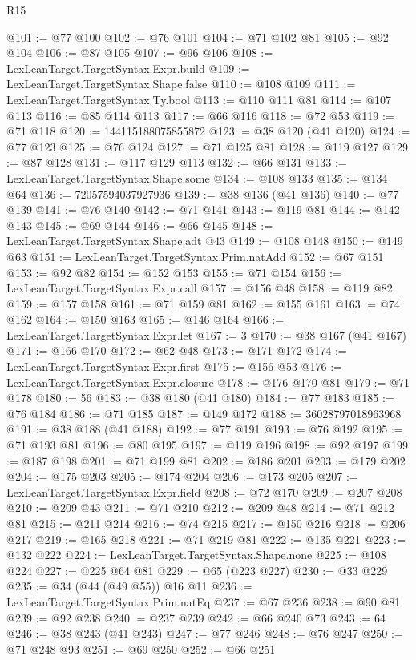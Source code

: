 \begin{lexlean}{R15}
\begin{coremodule}
@101 := @77 @100
@102 := @76 @101
@104 := @71 @102 @81
@105 := @92 @104
@106 := @87 @105
@107 := @96 @106
@108 := LexLeanTarget.TargetSyntax.Expr.build
@109 := LexLeanTarget.TargetSyntax.Shape.false
@110 := @108 @109
@111 := LexLeanTarget.TargetSyntax.Ty.bool
@113 := @110 @111 @81
@114 := @107 @113
@116 := @85 @114 @113
@117 := @66 @116
@118 := @72 @53
@119 := @71 @118
@120 := 144115188075855872
@123 := @38 @120 (@41 @120)
@124 := @77 @123
@125 := @76 @124
@127 := @71 @125 @81
@128 := @119 @127
@129 := @87 @128
@131 := @117 @129 @113
@132 := @66 @131
@133 := LexLeanTarget.TargetSyntax.Shape.some
@134 := @108 @133
@135 := @134 @64
@136 := 72057594037927936
@139 := @38 @136 (@41 @136)
@140 := @77 @139
@141 := @76 @140
@142 := @71 @141
@143 := @119 @81
@144 := @142 @143
@145 := @69 @144
@146 := @66 @145
@148 := LexLeanTarget.TargetSyntax.Shape.adt @43
@149 := @108 @148
@150 := @149 @63
@151 := LexLeanTarget.TargetSyntax.Prim.natAdd
@152 := @67 @151
@153 := @92 @82
@154 := @152 @153
@155 := @71 @154
@156 := LexLeanTarget.TargetSyntax.Expr.call
@157 := @156 @48
@158 := @119 @82
@159 := @157 @158
@161 := @71 @159 @81
@162 := @155 @161
@163 := @74 @162
@164 := @150 @163
@165 := @146 @164
@166 := LexLeanTarget.TargetSyntax.Expr.let
@167 := 3
@170 := @38 @167 (@41 @167)
@171 := @166 @170
@172 := @62 @48
@173 := @171 @172
@174 := LexLeanTarget.TargetSyntax.Expr.first
@175 := @156 @53
@176 := LexLeanTarget.TargetSyntax.Expr.closure
@178 := @176 @170 @81
@179 := @71 @178
@180 := 56
@183 := @38 @180 (@41 @180)
@184 := @77 @183
@185 := @76 @184
@186 := @71 @185
@187 := @149 @172
@188 := 36028797018963968
@191 := @38 @188 (@41 @188)
@192 := @77 @191
@193 := @76 @192
@195 := @71 @193 @81
@196 := @80 @195
@197 := @119 @196
@198 := @92 @197
@199 := @187 @198
@201 := @71 @199 @81
@202 := @186 @201
@203 := @179 @202
@204 := @175 @203
@205 := @174 @204
@206 := @173 @205
@207 := LexLeanTarget.TargetSyntax.Expr.field
@208 := @72 @170
@209 := @207 @208
@210 := @209 @43
@211 := @71 @210
@212 := @209 @48
@214 := @71 @212 @81
@215 := @211 @214
@216 := @74 @215
@217 := @150 @216
@218 := @206 @217
@219 := @165 @218
@221 := @71 @219 @81
@222 := @135 @221
@223 := @132 @222
@224 := LexLeanTarget.TargetSyntax.Shape.none
@225 := @108 @224
@227 := @225 @64 @81
@229 := @65 (@223 @227)
@230 := @33 @229
@235 := @34 (@44 (@49 @55)) @16 @11
@236 := LexLeanTarget.TargetSyntax.Prim.natEq
@237 := @67 @236
@238 := @90 @81
@239 := @92 @238
@240 := @237 @239
@242 := @66 @240 @73
@243 := 64
@246 := @38 @243 (@41 @243)
@247 := @77 @246
@248 := @76 @247
@250 := @71 @248 @93
@251 := @69 @250
@252 := @66 @251

\end{coremodule}
\end{lexlean}
